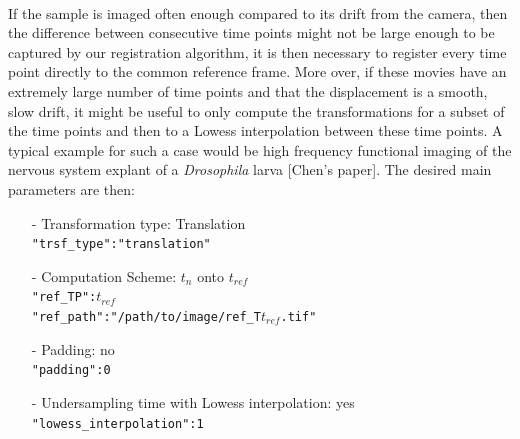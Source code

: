 \documentclass[10pt,a4paper]{article}
\begin{document}
\paragraph{}If the sample is imaged often enough compared to its drift from the camera, then the difference between consecutive time points might not be large enough to be captured by our registration algorithm, it is then necessary to register every time point directly to the common reference frame. More over, if these movies have an extremely large number of time points and that the displacement is a smooth, slow drift, it might be useful to only compute the transformations for a subset of the time points and then to a Lowess interpolation between these time points. A typical example for such a case would be high frequency functional imaging of the nervous system explant of a \textit{Drosophila} larva [Chen's paper]. The desired main parameters are then:
	\begin{itemize}
		\item[-] Transformation type: Translation\\
					\texttt{"trsf\_type":"translation"}
		\item[-] Computation Scheme: $t_n$ onto $t_{ref}$\\
					\texttt{"ref\_TP":$t_{ref}$}\\
					\texttt{"ref\_path":"/path/to/image/ref\_T$t_{ref}$.tif"}
		\item[-] Padding: no\\
					\texttt{"padding":0}
		\item[-] Undersampling time with Lowess interpolation: yes\\
					\texttt{"lowess\_interpolation":1}
	\end{itemize}
\end{document}

